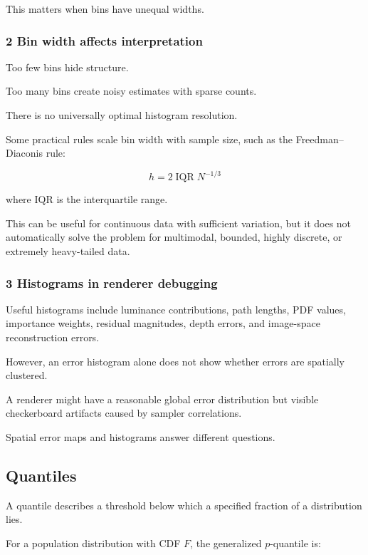 This matters when bins have unequal widths.

\subsubsection{2 Bin width affects interpretation}\label{02-foundations-ii-ch030-bin-width-affects-interpretation}

Too few bins hide structure.

Too many bins create noisy estimates with sparse counts.

There is no universally optimal histogram resolution.

Some practical rules scale bin width with sample size, such as the Freedman--Diaconis rule:

\[
 \boxed{ h=2\operatorname{IQR}N^{-1/3} }
\]

where IQR is the interquartile range.

This can be useful for continuous data with sufficient variation, but it does not automatically solve the problem for multimodal, bounded, highly discrete, or extremely heavy-tailed data.

\subsubsection{3 Histograms in renderer debugging}\label{02-foundations-ii-ch030-histograms-in-renderer-debugging}

Useful histograms include luminance contributions, path lengths, PDF values, importance weights, residual magnitudes, depth errors, and image-space reconstruction errors.

However, an error histogram alone does not show whether errors are spatially clustered.

A renderer might have a reasonable global error distribution but visible checkerboard artifacts caused by sampler correlations.

Spatial error maps and histograms answer different questions.

\subsection{Quantiles}\label{02-foundations-ii-ch030-quantiles}

A quantile describes a threshold below which a specified fraction of a distribution lies.

For a population distribution with CDF \(F\), the generalized \(p\)-quantile is:

